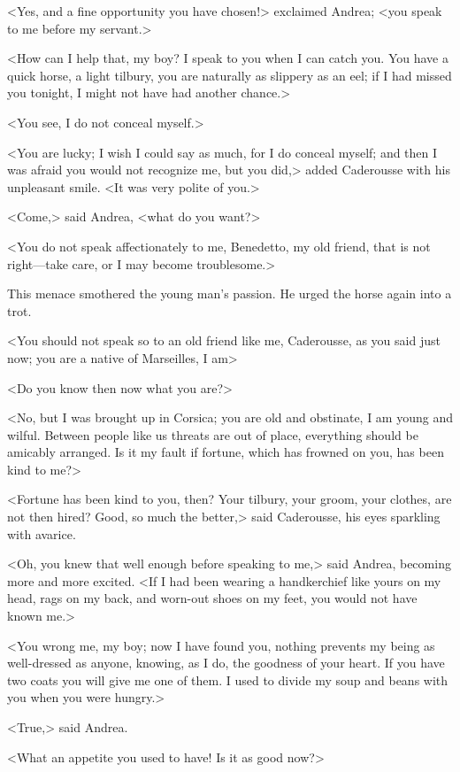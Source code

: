  <Yes, and a fine opportunity you have chosen!> exclaimed Andrea; <you speak to me before my servant.> 

 <How can I help that, my boy? I speak to you when I can catch you. You have a quick horse, a light tilbury, you are naturally as slippery as an eel; if I had missed you tonight, I might not have had another chance.> 

 <You see, I do not conceal myself.> 

 <You are lucky; I wish I could say as much, for I do conceal myself; and then I was afraid you would not recognize me, but you did,> added Caderousse with his unpleasant smile. <It was very polite of you.> 

 <Come,> said Andrea, <what do you want?> 

 <You do not speak affectionately to me, Benedetto, my old friend, that is not right—take care, or I may become troublesome.> 

 This menace smothered the young man's passion. He urged the horse again into a trot. 

 <You should not speak so to an old friend like me, Caderousse, as you said just now; you are a native of Marseilles, I am\longdash> 

 <Do you know then now what you are?> 

 <No, but I was brought up in Corsica; you are old and obstinate, I am young and wilful. Between people like us threats are out of place, everything should be amicably arranged. Is it my fault if fortune, which has frowned on you, has been kind to me?> 

 <Fortune has been kind to you, then? Your tilbury, your groom, your clothes, are not then hired? Good, so much the better,> said Caderousse, his eyes sparkling with avarice. 

 <Oh, you knew that well enough before speaking to me,> said Andrea, becoming more and more excited. <If I had been wearing a handkerchief like yours on my head, rags on my back, and worn-out shoes on my feet, you would not have known me.> 

 <You wrong me, my boy; now I have found you, nothing prevents my being as well-dressed as anyone, knowing, as I do, the goodness of your heart. If you have two coats you will give me one of them. I used to divide my soup and beans with you when you were hungry.> 

 <True,> said Andrea. 

 <What an appetite you used to have! Is it as good now?> 

